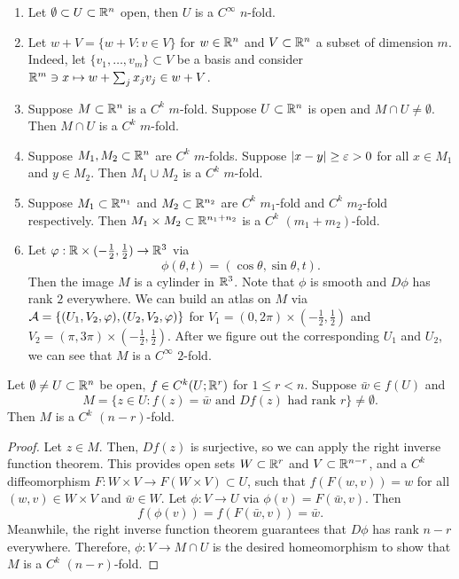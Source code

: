 \documentclass[a4paper]{article}
\begin{document}
\begin{eg}
\begin{enumerate}
\item Let $\emptyset \subset U \subset \mathbb{R}^n$ open, then 
$U$ is a $C^\infty$ $n$-fold. 

\item Let $w + V = \{w + V : v \in V\}$ for $w \in \mathbb{R}^n$
and $V \subset \mathbb{R}^n$ a subset of dimension $m$. Indeed, 
let $\{v_1, \dots, v_m\} \subset V$ be a basis and consider 
$\mathbb{R}^m \ni x \mapsto w + \sum_j x_j v_j \in w + V$.

\item Suppose $M \subset \mathbb{R}^n$ is a $C^k$ $m$-fold. 
Suppose $U \subset \mathbb{R}^n$ is open and $M \cap U \neq 
\emptyset$. Then $M \cap U$ is a $C^k$ $m$-fold.

\item Suppose $M_1, M_2 \subset \mathbb{R}^n$ are $C^k$
$m$-folds. Suppose $\left\lvert x - y\right\rvert \geq \varepsilon > 0$ for all 
$x \in M_1$ and $y \in M_2$. Then $M_1 \cup M_2$ is a 
$C^k$ $m$-fold.

\item Suppose $M_1 \subset \mathbb{R}^{n_1}$ and $M_2 \subset \mathbb{R}^{n_2}$
are $C^k$ $m_1$-fold and $C^k$ $m_2$-fold respectively. 
Then $M_1 \times M_2 \subset \mathbb{R}^{n_1 + n_2}$ is a 
$C^k$ $(m_1 + m_2)$-fold.

\item Let $\varphi: \mathbb{R} \times (-\frac{1}{2}, \frac{1}{2}) 
\to \mathbb{R}^3$ via 
\[
\phi(\theta, t) = (\cos \theta, \sin \theta, t).
\]
Then the image $M$ is a cylinder in $\mathbb{R}^3$. Note that $\phi$
is smooth and $D \phi$ has rank $2$ everywhere. We can build 
an atlas on $M$ via $\mathcal{A} = \{(U_1, V_2, \varphi), (U_2, V_2, \varphi)\}$ 
for $V_1 = (0, 2\pi) \times (-\frac{1}{2}, \frac{1}{2})$ and
$V_2 = (\pi, 3\pi) \times (-\frac{1}{2}, \frac{1}{2})$.
After we figure out the corresponding $U_1$ and $U_2$, 
we can see that $M$ is a $C^\infty$ $2$-fold.
\end{enumerate}
\end{eg}

\begin{thm}
Let $\emptyset \neq U \subset \mathbb{R}^n$ be open, $f \in C^k(U; 
\mathbb{R}^r)$ for $1 \leq r < n$. Suppose $\bar{w} \in f(U)$ and 
\[
M = \{z \in U : f(z) = \bar{w} \text{ and } Df(z) \text{ had rank 
$r$}\} \neq \emptyset.
\]
Then $M$ is a $C^k$ $(n-r)$-fold.
\end{thm}

\begin{proof}
Let $z \in M$. Then, $Df(z)$ is surjective, so we can apply
the right inverse function theorem.  This provides 
open sets $W \subset \mathbb{R}^r$ and $V \subset \mathbb{R}^{n-r}$, and 
a $C^k$ diffeomorphism 
$F : W \times V \to F(W \times V) \subset U$, such that 
$f(F(w, v)) = w$ for all $(w, v) \in W \times V$ and 
$\bar{w} \in W$. Let $\phi: V \to U$ via 
$\phi(v) = F(\bar{w}, v)$. Then
\[
f(\phi(v)) = f(F(\bar{w}, v)) = \bar{w}.
\]
Meanwhile, the right inverse function theorem 
guarantees that $D \phi$ has rank $n - r$ everywhere.
Therefore, $\phi: V \to M \cap U$ is the desired 
homeomorphism to show that $M$ is a $C^k$ $(n-r)$-fold.
\end{proof}
\end{document}
